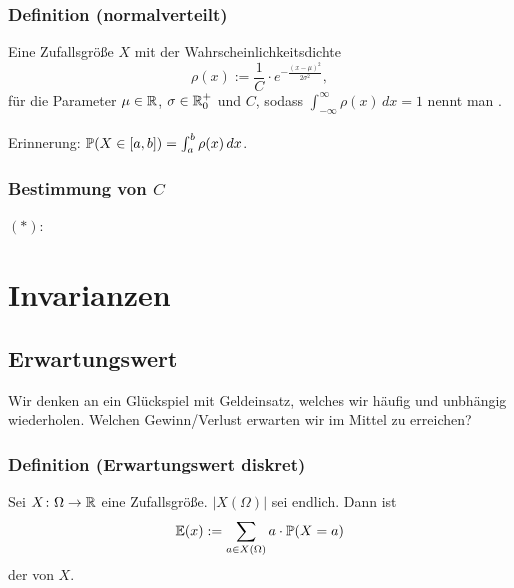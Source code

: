 \subsubsection{Definition (normalverteilt)}
Eine Zufallsgr\"o\ss{}e $X$ mit der Wahrscheinlichkeitsdichte
\[\rho(x):=\frac{1}{C}\cdot e^{-\frac{(x-\mu)^2}{2\sigma^{2}}},\]
f\"ur die Parameter $\mu\in\mathbb{R}$, $\sigma\in\mathbb{R}_0^+$ und $C$, sodass $\int_{-\infty}^{\infty}\rho(x)\,dx=1$ nennt man .
\\~\\
Erinnerung: $\mathbb{P}(X\in[a,b])=\int_a^b\rho(x)\,dx$.
\subsubsection{Bestimmung von $C$}
$(*)$:
\section{Invarianzen}
\subsection{Erwartungswert}
Wir denken an ein Gl\"uckspiel mit Geldeinsatz, welches wir h\"aufig und unbh\"angig wiederholen. Welchen Gewinn/Verlust erwarten wir im Mittel zu erreichen?
\subsubsection{Definition (Erwartungswert diskret)}
Sei $X\colon\Omega\to\mathbb{R}$ eine Zufallsgr\"o\ss{}e. $|X(\Omega)|$ sei endlich. Dann ist
\[\mathbb{E}(x):=\sum_{a\in X(\Omega)}a\cdot\mathbb{P}(X=a)\]
der  von $X$.
